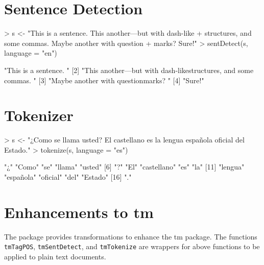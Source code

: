 \documentclass[a4paper]{article}
\newcommand{\strong}[1]{{\normalfont\fontseries{b}\selectfont #1}}
\newcommand{\code}[1]{\mbox{\texttt{#1}}}
\newcommand{\pkg}[1]{\strong{#1}}
\begin{document}
\section*{Sentence Detection}
\begin{Schunk}
\begin{Sinput}
> s <- "This is a sentence. This another---but with dash-like
+       structures, and some commas. Maybe another with question
+       marks? Sure!"
> sentDetect(s, language = "en")
\end{Sinput}
\begin{Soutput}
[1] "This is a sentence. "                                                  
[2] "This another---but with dash-like\n      structures, and some commas. "
[3] "Maybe another with question\n      marks? "                            
[4] "Sure!"                                                                 
\end{Soutput}
\end{Schunk}

\section*{Tokenizer}
\begin{Schunk}
\begin{Sinput}
> s <- "¿Como se llama usted? El castellano es la lengua española oficial del Estado."
> tokenize(s, language = "es")
\end{Sinput}
\begin{Soutput}
 [1] "¿"          "Como"       "se"         "llama"      "usted"     
 [6] "?"          "El"         "castellano" "es"         "la"        
[11] "lengua"     "española"   "oficial"    "del"        "Estado"    
[16] "."         
\end{Soutput}
\end{Schunk}

\section*{Enhancements to tm}
The package provides transformations to enhance the \pkg{tm}
package. The functions \code{tmTagPOS}, \code{tmSentDetect}, and
\code{tmTokenize} are wrappers for above functions to be applied to
plain text documents.
\end{document}
